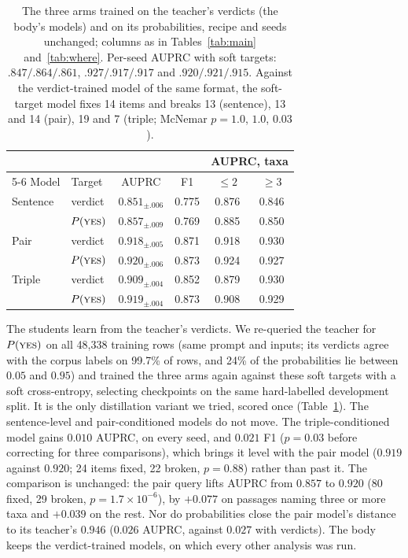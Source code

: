 \documentclass[11pt]{article}
\begin{document}
\begin{table}[t]\centering\small
\setlength{\tabcolsep}{2.8pt}
\begin{tabular}{llcccc}
\toprule
 & & & & \multicolumn{2}{c}{AUPRC, taxa} \\
\cmidrule(lr){5-6}
Model & Target & AUPRC & F1 & $\le 2$ & $\ge 3$ \\
\midrule
Sentence & verdict & $0.851_{\pm .006}$ & 0.775 & 0.876 & 0.846 \\
         & $P(\textsc{yes})$ & $0.857_{\pm .009}$ & 0.769 & 0.885 & 0.850 \\
Pair     & verdict & $0.918_{\pm .005}$ & 0.871 & 0.918 & 0.930 \\
         & $P(\textsc{yes})$ & $0.920_{\pm .006}$ & 0.873 & 0.924 & 0.927 \\
Triple   & verdict & $0.909_{\pm .004}$ & 0.852 & 0.879 & 0.930 \\
         & $P(\textsc{yes})$ & $0.919_{\pm .004}$ & 0.873 & 0.908 & 0.929 \\
\bottomrule
\end{tabular}
\caption{The three arms trained on the teacher's verdicts (the body's models) and on its
probabilities, recipe and seeds unchanged; columns as in Tables~\ref{tab:main} and~\ref{tab:where}.
Per-seed AUPRC with soft targets: $.847/.864/.861$, $.927/.917/.917$ and $.920/.921/.915$. Against
the verdict-trained model of the same format, the soft-target model fixes 14 items and breaks 13
(sentence), 13 and 14 (pair), 19 and 7 (triple; McNemar $p = 1.0$, $1.0$, $0.03$).}
\label{tab:soft}
\end{table}

The students learn from the teacher's verdicts. We re-queried the teacher for $P(\textsc{yes})$ on
all 48{,}338 training rows (same prompt and inputs; its verdicts agree with the corpus labels on
99.7\% of rows, and 24\% of the probabilities lie between $0.05$ and $0.95$) and trained the three
arms again against these soft targets with a soft cross-entropy, selecting checkpoints on the same
hard-labelled development split. It is the only distillation variant we tried, scored once
(Table~\ref{tab:soft}). The sentence-level and pair-conditioned models do not move. The
triple-conditioned model gains $0.010$ AUPRC, on every seed, and $0.021$ F1 ($p = 0.03$ before
correcting for three comparisons), which brings it level with the pair model ($0.919$ against
$0.920$; 24 items fixed, 22 broken, $p = 0.88$) rather than past it. The comparison is unchanged:
the pair query lifts AUPRC from $0.857$ to $0.920$ (80 fixed, 29 broken, $p = 1.7\times10^{-6}$),
by $+0.077$ on passages naming three or more taxa and $+0.039$ on the rest. Nor do probabilities
close the pair model's distance to its teacher's $0.946$ ($0.026$ AUPRC, against $0.027$ with
verdicts). The body keeps the verdict-trained models, on which every other analysis was run.
\end{document}
